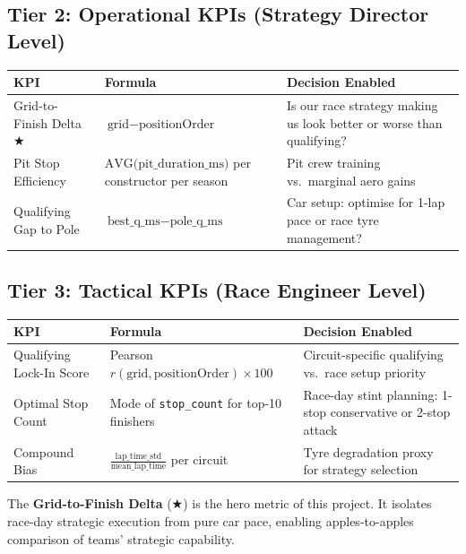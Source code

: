 \documentclass[12pt, a4paper]{article}
\begin{document}
\subsection{Tier 2: Operational KPIs (Strategy Director Level)}

\begin{table}[H]
\centering
\begin{tabularx}{\textwidth}{l l X}
\toprule
\textbf{KPI} & \textbf{Formula} & \textbf{Decision Enabled} \\
\midrule
Grid-to-Finish Delta $\bigstar$ & $\text{grid} - \text{positionOrder}$ & Is our race strategy making us look better or worse than qualifying? \\[6pt]
Pit Stop Efficiency & $\text{AVG(pit\_duration\_ms)}$ per constructor per season & Pit crew training vs.\ marginal aero gains \\[6pt]
Qualifying Gap to Pole & $\text{best\_q\_ms} - \text{pole\_q\_ms}$ & Car setup: optimise for 1-lap pace or race tyre management? \\
\bottomrule
\end{tabularx}
\end{table}

\subsection{Tier 3: Tactical KPIs (Race Engineer Level)}

\begin{table}[H]
\centering
\begin{tabularx}{\textwidth}{l l X}
\toprule
\textbf{KPI} & \textbf{Formula} & \textbf{Decision Enabled} \\
\midrule
Qualifying Lock-In Score & Pearson $r(\text{grid}, \text{positionOrder}) \times 100$ & Circuit-specific qualifying vs.\ race setup priority \\[6pt]
Optimal Stop Count & Mode of \texttt{stop\_count} for top-10 finishers & Race-day stint planning: 1-stop conservative or 2-stop attack \\[6pt]
Compound Bias & $\frac{\text{lap\_time\_std}}{\text{mean\_lap\_time}}$ per circuit & Tyre degradation proxy for strategy selection \\
\bottomrule
\end{tabularx}
\end{table}

The \textbf{Grid-to-Finish Delta} ($\bigstar$) is the hero metric of this project. It isolates race-day strategic execution from pure car pace, enabling apples-to-apples comparison of teams' strategic capability.
\end{document}
